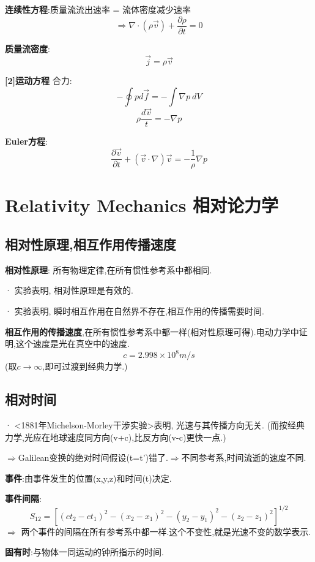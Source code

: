 \documentclass{article}
\begin{document}
        \textbf{连续性方程}:质量流流出速率 = 流体密度减少速率
            $$\Rightarrow \nabla \cdot (\rho \vec v) +  \frac{\partial \rho}{\partial t} = 0$$
        
        \textbf{质量流密度}:
            $$\vec j = \rho \vec v$$
        
        \textbf{[2]运动方程}
            合力:
            $$-\oint p d \vec f = -\int \nabla p\ dV$$
            $$\rho \frac{d \vec v}{t} = -\nabla p$$
        
        \textbf{Euler方程}:
            $$\frac{\partial \vec v}{\partial t} + (\vec v \cdot \nabla)\vec v = - \frac{1}{\rho}\nabla p$$


\section{Relativity Mechanics 相对论力学}
    \subsection{相对性原理,相互作用传播速度}
        \textbf{相对性原理}: 所有物理定律,在所有惯性参考系中都相同.
        
        · 实验表明, 相对性原理是有效的.
        
        · 实验表明, 瞬时相互作用在自然界不存在,相互作用的传播需要时间.
        
        \textbf{相互作用的传播速度},在所有惯性参考系中都一样(相对性原理可得).\quad 电动力学中证明,这个速度是光在真空中的速度.
            $$c = 2.998 \times 10^8 m/s$$
            (取$c\to \infty$,即可过渡到经典力学.)


    \subsection{相对时间}
        · <1881年Michelson-Morley干涉实验>表明, 光速与其传播方向无关. (而按经典力学,光应在地球速度同方向(v+c),比反方向(v-c)更快一点.)
        
        $\Rightarrow$Galilean变换的绝对时间假设(t=t')错了.\quad  $\Rightarrow$不同参考系,时间流逝的速度不同.
        
        \textbf{事件}:由事件发生的位置(x,y,z)和时间(t)决定.
        
        \textbf{事件间隔}:
            $$S_{12} = [(ct_2-ct_1)^2 - (x_2-x_1)^2 - (y_2-y_1)^2 - (z_2-z_1)^2]^{1/2}$$
            $\Rightarrow$ 两个事件的间隔在所有参考系中都一样.\quad 这个不变性,就是光速不变的数学表示.
        
        \textbf{固有时}:与物体一同运动的钟所指示的时间.
        
\end{document}
